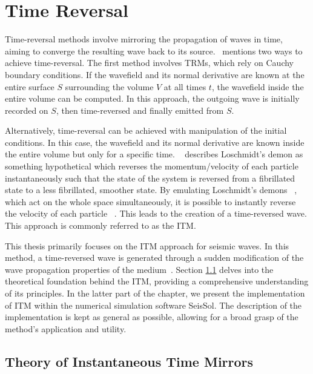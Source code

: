 \chapter{Time Reversal}\label{chapter:TimeReversal}

Time-reversal methods involve mirroring the propagation of waves in time, aiming to converge the resulting wave back to its source.~\parencite{Fink2017} mentions two ways to achieve time-reversal.
The first method involves \ac{TRM}s, which rely on Cauchy boundary conditions. If the wavefield and its normal derivative are known at the entire surface $S$ surrounding the volume
$V$ at all times $t$, the wavefield inside the entire volume can be computed. In this approach, the outgoing wave is initially 
recorded on $S$, then time-reversed and finally emitted from $S$. 

\par Alternatively, time-reversal can be achieved with manipulation of the initial conditions. In this case, the wavefield and its normal derivative
are known inside the entire volume but only for a specific time. ~\parencite{Weinert2016} describes Loschmidt's demon as something hypothetical which reverses the momentum/velocity of each particle instantaneously such that the state of the system is reversed 
from a fibrillated state to a less fibrillated, smoother state.
By emulating Loschmidt's demons ~\parencite{Weinert2016},  which act on the whole space simultaneously, it is possible to instantly reverse
the velocity of each particle ~\parencite{Fink2017}. This leads to the creation of a time-reversed wave. This approach is commonly referred to as the \acf{ITM}.

\par This thesis primarily focuses on the \ac{ITM} approach for seismic waves. In this method, a time-reversed wave is generated through a sudden modification of the wave propagation
properties of the medium~\parencite{Bacot2016}. Section \ref{section:ITMTheory} delves into the theoretical foundation behind the \ac{ITM}, providing a comprehensive
understanding of its principles. In the latter part of the chapter, we present the implementation of \ac{ITM} within the numerical simulation software SeisSol. The
description of the implementation is kept as general as possible, allowing for a broad grasp of the method's application and utility.

\section{Theory of Instantaneous Time Mirrors}\label{section:ITMTheory}

